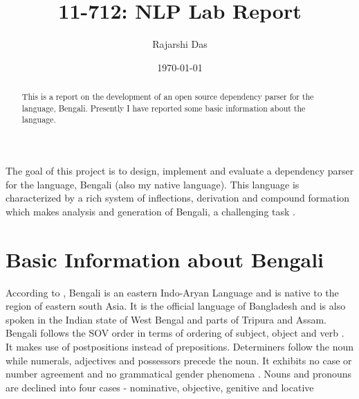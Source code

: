 \documentclass[11pt,letterpaper]{article}
\title{11-712:  NLP Lab Report}
\author{Rajarshi Das}
\date{\today}
\newcommand{\nascomment}[1]{\textcolor{blue}{\textbf{[#1 --NAS]}}}
\begin{document}
\maketitle
\begin{abstract}
\noindent This is a report on the development of an open source dependency parser for the language, Bengali. Presently I have reported some basic information about the language.
\end{abstract}

\noindent The goal of this project is to design, implement and evaluate a dependency parser for the language, Bengali (also my native language). This language is characterized by a rich system of inflections, derivation and compound formation \citep{saha2004computer,chakroborty2003uchchotoro} which makes analysis and generation of Bengali, a challenging task \citep{ghosh2009dependency}.

\section{Basic Information about Bengali}
According to \citep{ethnologue}, Bengali is an eastern Indo-Aryan Language and is native to the region of eastern south Asia. It is the official language of Bangladesh and is also spoken in the Indian state of West Bengal and parts of Tripura and Assam.\\

\noindent Bengali follows the SOV order in terms of ordering of subject, object and verb \citep{Dasgupta-2003}. It makes use of postpositions instead of prepositions. Determiners follow the noun while numerals, adjectives and possessors precede the noun. It exhibits no case or number agreement and no grammatical gender phenomena \citep{Dasgupta-2003}. Nouns and pronouns are declined into four cases - nominative, objective, genitive and locative \citep{Bhattacharya}\\
\end{document}
